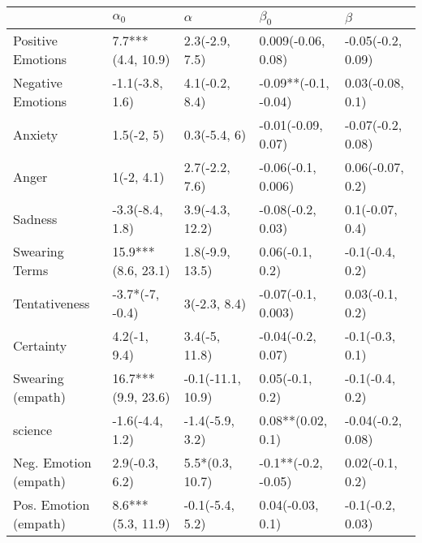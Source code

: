\begin{tabular}{lllll}
\toprule
{} &          $\alpha_0$ &           $\alpha$ &             $\beta_0$ &            $\beta$ \\
\midrule
Positive Emotions     &   7.7***(4.4, 10.9) &     2.3(-2.9, 7.5) &    0.009(-0.06, 0.08) &  -0.05(-0.2, 0.09) \\
Negative Emotions     &     -1.1(-3.8, 1.6) &     4.1(-0.2, 8.4) &  -0.09**(-0.1, -0.04) &   0.03(-0.08, 0.1) \\
Anxiety               &          1.5(-2, 5) &       0.3(-5.4, 6) &    -0.01(-0.09, 0.07) &  -0.07(-0.2, 0.08) \\
Anger                 &          1(-2, 4.1) &     2.7(-2.2, 7.6) &    -0.06(-0.1, 0.006) &   0.06(-0.07, 0.2) \\
Sadness               &     -3.3(-8.4, 1.8) &    3.9(-4.3, 12.2) &     -0.08(-0.2, 0.03) &    0.1(-0.07, 0.4) \\
Swearing Terms        &  15.9***(8.6, 23.1) &    1.8(-9.9, 13.5) &       0.06(-0.1, 0.2) &    -0.1(-0.4, 0.2) \\
Tentativeness         &     -3.7*(-7, -0.4) &       3(-2.3, 8.4) &    -0.07(-0.1, 0.003) &    0.03(-0.1, 0.2) \\
Certainty             &        4.2(-1, 9.4) &      3.4(-5, 11.8) &     -0.04(-0.2, 0.07) &    -0.1(-0.3, 0.1) \\
Swearing (empath)     &  16.7***(9.9, 23.6) &  -0.1(-11.1, 10.9) &       0.05(-0.1, 0.2) &    -0.1(-0.4, 0.2) \\
science               &     -1.6(-4.4, 1.2) &    -1.4(-5.9, 3.2) &     0.08**(0.02, 0.1) &  -0.04(-0.2, 0.08) \\
Neg. Emotion (empath) &      2.9(-0.3, 6.2) &    5.5*(0.3, 10.7) &   -0.1**(-0.2, -0.05) &    0.02(-0.1, 0.2) \\
Pos. Emotion (empath) &   8.6***(5.3, 11.9) &    -0.1(-5.4, 5.2) &      0.04(-0.03, 0.1) &   -0.1(-0.2, 0.03) \\
\bottomrule
\end{tabular}
